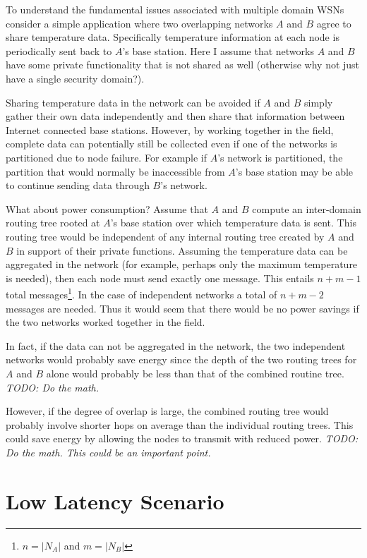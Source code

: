 \documentclass{article}
\newcommand{\todo}[1]{\textit{TODO: #1}}
\begin{document}
To understand the fundamental issues associated with multiple domain WSNs consider a simple
application where two overlapping networks $A$ and $B$ agree to share temperature data.
Specifically temperature information at each node is periodically sent back to $A$'s base
station. Here I assume that networks $A$ and $B$ have some private functionality that is not
shared as well (otherwise why not just have a single security domain?).

Sharing temperature data in the network can be avoided if $A$ and $B$ simply gather their own
data independently and then share that information between Internet connected base stations.
However, by working together in the field, complete data can potentially still be collected even
if one of the networks is partitioned due to node failure. For example if $A$'s network is
partitioned, the partition that would normally be inaccessible from $A$'s base station may be
able to continue sending data through $B$'s network.

What about power consumption? Assume that $A$ and $B$ compute an inter-domain routing tree
rooted at $A$'s base station over which temperature data is sent. This routing tree would be
independent of any internal routing tree created by $A$ and $B$ in support of their private
functions. Assuming the temperature data can be aggregated in the network (for example, perhaps
only the maximum temperature is needed), then each node must send exactly one message. This
entails $n + m - 1$ total messages\footnote{$n = |N_A|$ and $m = |N_B|$}. In the case of
independent networks a total of $n + m - 2$ messages are needed. Thus it would seem that there
would be no power savings if the two networks worked together in the field.

In fact, if the data can not be aggregated in the network, the two independent networks would
probably save energy since the depth of the two routing trees for $A$ and $B$ alone would
probably be less than that of the combined routine tree. \todo{Do the math.}

However, if the degree of overlap is large, the combined routing tree would probably involve
shorter hops on average than the individual routing trees. This could save energy by allowing
the nodes to transmit with reduced power. \todo{Do the math. This could be an important point.}


\section{Low Latency Scenario}
\end{document}
